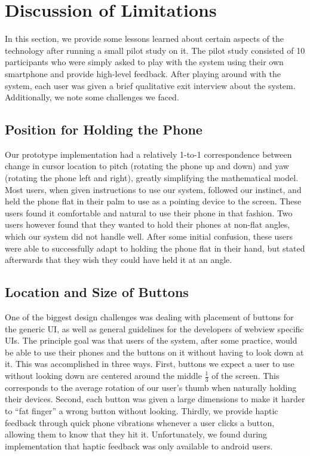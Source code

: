\section{Discussion of Limitations}

In this section, we provide some lessons learned about certain
aspects of the technology after running a small pilot study on
it. The pilot study consisted of 10 participants who were simply
asked to play with the system using their own smartphone and
provide high-level feedback. After playing around with the system,
each user was given a brief qualitative exit interview about the
system. Additionally, we note some challenges we faced.

\subsection{Position for Holding the Phone}

Our prototype implementation had a relatively 1-to-1
correspondence between change in cursor location to pitch (rotating
the phone up and down) and yaw (rotating the phone left and right),
greatly simplifying the mathematical model. Most users, when given
instructions to use our system, followed our instinct, and held the
phone flat in their palm to use as a pointing device to the screen.
These users found it comfortable and natural to use their phone in
that fashion. Two users however found that they wanted to hold
their phones at non-flat angles, which our system did not handle well.
After some initial confusion, these users were able to successfully
adapt to holding the phone flat in their hand, but stated afterwards
that they wish they could have held it at an angle.

\subsection{Location and Size of Buttons}

One of the biggest design challenges was dealing with placement of
buttons for the generic UI, as well as general guidelines for the
developers of webview specific UIs. The principle goal was that
users of the system, after some practice, would be able to use
their phones and the buttons on it without having to look down
at it. This was accomplished in three ways. First, buttons we expect a
user to use without looking down are centered around the middle
$\frac{1}{3}$ of the screen. This corresponds to the average rotation
of our user's thumb when naturally holding their devices. Second,
each button was given a large dimensions to make it harder to ``fat
finger'' a wrong button without looking. Thirdly, we provide haptic
feedback through quick phone vibrations whenever a user clicks a
button, allowing them to know that they hit it. Unfortunately, we
found during implementation that haptic feedback was only available
to android users.

